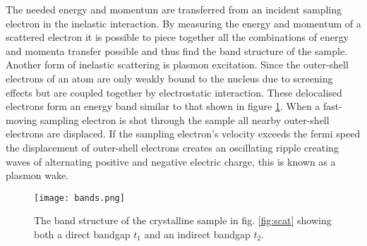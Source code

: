 The needed energy and momentum are transferred from an incident sampling electron in the inelastic interaction. By measuring the energy and momentum of a scattered electron it is possible to piece together all the combinations of energy and momenta transfer possible and thus find the band structure of the sample.\\
Another form of inelastic scattering is plasmon excitation. Since the outer-shell electrons of an atom are only weakly bound to the nucleus due to screening effects but are coupled together by electrostatic interaction. These delocalised electrons form an energy band similar to that shown in figure \ref{fig:bands}. When a fast-moving sampling electron is shot through the sample all nearby outer-shell electrons are displaced. If the sampling electron's velocity exceeds the fermi speed the displacement of outer-shell electrons creates an oscillating ripple creating waves of alternating positive and negative electric charge, this is known as a plasmon wake.\cite{Egerton_2008}
%
\begin{figure}[H]
	\centering
	\captionsetup{width=0.9\linewidth}
	\texttt{[image: bands.png]}
	\caption{The band structure of the crystalline sample in fig. \ref{fig:scat} showing both a direct bandgap $t_1$ and an indirect bandgap $t_2$.}
	\label{fig:bands}
\end{figure}
%
%
